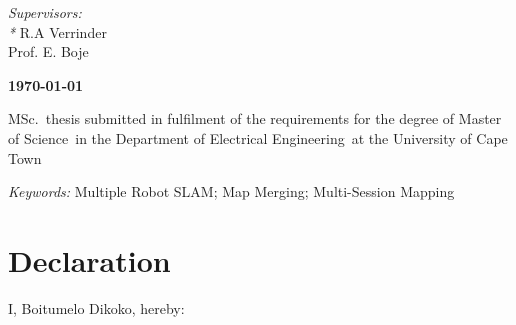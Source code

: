 \documentclass[a4paper, 12pt, oneside, openright, parskip=full]{book}
\newcommand{\auth}{Boitumelo Dikoko}								%
\newcommand{\dept}{Department of Electrical Engineering}%
\newcommand{\uni}{University of Cape Town}				%
\newcommand{\degre}{Master of Science}				%
\newcommand{\degreeabv}{MSc.}							%
\newcommand{\supervisor}{R.A Verrinder}					%
\newcommand{\cosupervisor}{Prof. E. Boje}					%
\newcommand{\key}{Multiple Robot SLAM; Map Merging; Multi-Session Mapping}					   %
\begin{document}
\begin{titlepage}
\begin{normalsize}
		\vskip 15mm	
	\end{normalsize}
	\begin{large}					
		{\itshape Supervisors: \\*}
		\supervisor\\
		\cosupervisor\\
		\vskip 5mm
	\end{large}
	\begin{Large}					
		{\bfseries \mydate\today}
		\vskip 15mm	
	\end{Large}
		\degreeabv\ thesis submitted in fulfilment of the requirements for the degree of \degre\ in the \dept\ at the \uni
		
		\vskip 5mm	
	\begin{normalsize}				
		{\itshape Keywords:}
		\key			
	\end{normalsize}	
\end{titlepage}

\frontmatter
\chapter{Declaration}				
\label{ch:decl}
I, \auth,  hereby:
\end{document}
